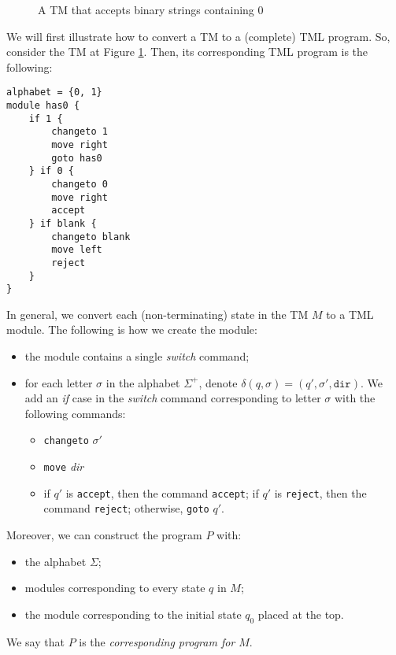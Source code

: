 \documentclass{article}
\begin{document}
    \begin{figure}[htb]
        \centering
        \caption{A TM that accepts binary strings containing 0}
        \label{fig:simple_tm}
    \end{figure}
    We will first illustrate how to convert a TM to a (complete) TML program. So, consider the TM at Figure \ref{fig:simple_tm}. Then, its corresponding TML program is the following:
\begin{lstlisting}[language=TML]
alphabet = {0, 1}
module has0 {
    if 1 {
        changeto 1
        move right
        goto has0
    } if 0 {
        changeto 0
        move right
        accept
    } if blank {
        changeto blank
        move left
        reject
    }
}
\end{lstlisting}
    In general, we convert each (non-terminating) state in the TM $M$ to a TML module. The following is how we create the module:
    \begin{itemize}
        \item the module contains a single \textit{switch} command;
        \item for each letter $\sigma$ in the alphabet $\Sigma^+$, denote $\delta(q, \sigma) = (q', \sigma', \texttt{dir})$. We add an \textit{if} case in the \textit{switch} command corresponding to letter $\sigma$ with the following commands:
        \begin{itemize}
            \item \texttt{changeto} $\sigma'$
            \item \texttt{move} \textit{dir}
            \item if $q'$ is \texttt{accept}, then the command \texttt{accept}; if $q'$ is \texttt{reject}, then the command \texttt{reject}; otherwise, \texttt{goto} $q'$.
        \end{itemize}
    \end{itemize}
    Moreover, we can construct the program $P$ with:
    \begin{itemize}
        \item the alphabet $\Sigma$;
        \item modules corresponding to every state $q$ in $M$;
        \item the module corresponding to the initial state $q_0$ placed at the top.
    \end{itemize}
    We say that $P$ is the \emph{corresponding program for $M$}.
\end{document}

